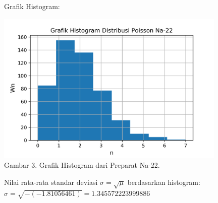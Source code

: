 \documentclass{article}
\begin{document}
			Grafik Histogram:
			\begin{center}
				\includegraphics[width=110mm]{Data/Na-22.png}\\
				Gambar 3. Grafik Histogram dari Preparat Na-22.
			\end{center}
			Nilai rata-rata standar deviasi $\sigma = \sqrt{\mu}$ berdasarkan histogram:\\
			$\sigma = \sqrt{-(-1.81056461)} = 1.345572223999886$ \newpage
			
\end{document}
